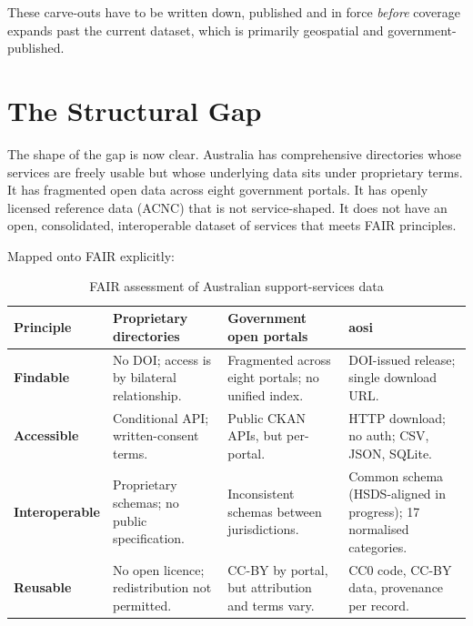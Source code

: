\documentclass[11pt,a4paper]{article}
\newcommand{\theadstyle}{\cellcolor{headerbg}\textbf}
\begin{document}
These carve-outs have to be written down, published and in force \emph{before} coverage expands past the current dataset, which is primarily geospatial and government-published.


\section{The Structural Gap}

The shape of the gap is now clear. Australia has comprehensive directories whose services are freely usable but whose underlying data sits under proprietary terms. It has fragmented open data across eight government portals. It has openly licensed reference data (ACNC) that is not service-shaped. It does not have an open, consolidated, interoperable dataset of services that meets FAIR principles.

Mapped onto FAIR explicitly:

\begin{table}[ht!]
\centering
\small
\begin{tabular}{@{}p{2.2cm}p{3.8cm}p{3.8cm}p{3.3cm}@{}}
\toprule
\rowcolor{headerbg} \theadstyle{Principle} & \theadstyle{Proprietary directories} & \theadstyle{Government open portals} & \theadstyle{aosi} \\
\midrule
\textbf{Findable} & No DOI; access is by bilateral relationship. & Fragmented across eight portals; no unified index. & DOI-issued release; single download URL. \\
\addlinespace
\textbf{Accessible} & Conditional API; written-consent terms. & Public CKAN APIs, but per-portal. & HTTP download; no auth; CSV, JSON, SQLite. \\
\addlinespace
\textbf{Interoperable} & Proprietary schemas; no public specification. & Inconsistent schemas between jurisdictions. & Common schema (HSDS-aligned in progress); 17 normalised categories. \\
\addlinespace
\textbf{Reusable} & No open licence; redistribution not permitted. & CC-BY by portal, but attribution and terms vary. & CC0 code, CC-BY data, provenance per record. \\
\bottomrule
\end{tabular}
\caption{FAIR assessment of Australian support-services data}
\end{table}
\end{document}
